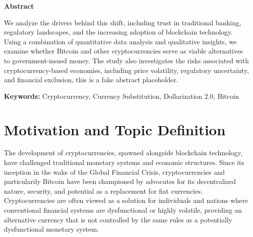 \documentclass[
]{article}
\begin{document}
\LARGE

\begin{center}

\Large

\textbf{Abstract}

\end{center}

\normalsize

We analyze the drivers behind this shift, including trust in traditional banking, regulatory landscapes, and the increasing adoption of blockchain technology. Using a combination of quantitative data analysis and qualitative insights, we examine whether Bitcoin and other cryptocurrencies serve as viable alternatives to government-issued money. The study also investigates the risks associated with cryptocurrency-based economies, including price volatility, regulatory uncertainty, and financial exclusion, this is a fake abstract placeholder.

\vspace{8cm}

\raggedright

\textbf{Keywords:} Cryptocurrency, Currency Substitution, Dollarization 2.0, Bitcoin

\newpage

\tableofcontents

\newpage

\listoffigures

\clearpage

\listoftables

\newpage

\pagestyle{arabic}

\section{Motivation and Topic Definition}\label{motivation-and-topic-definition}

The development of cryptocurrencies, spawned alongside blockchain technology, have challenged traditional monetary systems and economic structures. Since its inception in the wake of the Global Financial Crisis, cryptocurrencies and particularily Bitcoin have been championed by advocates for its decentralized nature, security, and potential as a replacement for fiat currencies. Cryptocurrencies are often viewed as a solution for individuals and nations where conventional financial systems are dysfunctional or highly volatile, providing an alternative currency that is not controlled by the same rules as a potentially dysfunctional monetary system.
\end{document}
